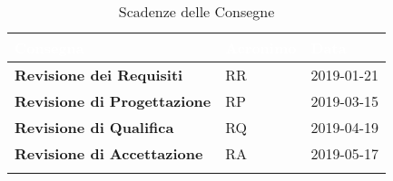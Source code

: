 \begin{longtable}{|C{.40\textwidth}|C{.15\textwidth}|C{.20\textwidth}|}
\hline
{}\textbf{\textcolor{white}{Consegna}} & \textbf{\textcolor{white}{Acronimo}} & \textbf{\textcolor{white}{Data}}\\
\hline \hline
\endfirsthead

\textbf{Revisione dei Requisiti} & RR & 2019-01-21 \\
\hline
{}\textbf{Revisione di Progettazione} & RP & 2019-03-15 \\
\hline
\textbf{Revisione di Qualifica} & RQ & 2019-04-19 \\
\hline
{}\textbf{Revisione di Accettazione} & RA & 2019-05-17 \\
\hline
\caption{Scadenze delle Consegne \label{table:Scadenze}}
\end{longtable}